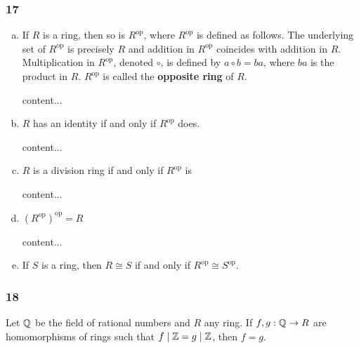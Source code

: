 \subsubsection*{17}
\begin{enumerate}[(a)]
	\item 
	\begin{graybox}
		If $R$ is a ring, then so is $R^{\text{op}}$, where $R^{\text{op}}$ is defined as follows. The underlying set of $R^{\text{op}}$ is precisely $R$ and addition in $R^{\text{op}}$ coincides with addition in $R$. Multiplication in $R^{\text{op}}$, denoted $\circ$, is defined by $a \circ b = ba$, where $ba$ is the product in $R$. $R^{\text{op}}$ is called the \textbf{opposite ring} of $R$.
	\end{graybox}
	\begin{solution}
		content...
	\end{solution}
	
	\item 
	\begin{graybox}
		$R$ has an identity if and only if $R^{\text{op}}$ does.
	\end{graybox}
	\begin{solution}
		content...
	\end{solution}
	
	\item 
	\begin{graybox}
		$R$ is a division ring if and only if $R^{\text{op}}$ is
	\end{graybox}
	\begin{solution}
		content...
	\end{solution}
	
	\item 
	\begin{graybox}
		$\left(R^{\text{op}}\right)^{\text{op}} = R$
	\end{graybox}
	\begin{solution}
		content...
	\end{solution}
	
	\item
	\begin{graybox}
		If $S$ is a ring, then $R \cong S$ if and only if $R^{\text{op}} \cong S^{\text{op}}$.
	\end{graybox}
\end{enumerate}

\subsubsection*{18}
\begin{graybox}
	Let $\mathbb{Q}$ be the field of rational numbers and $R$ any ring. If $f,g : \mathbb{Q} \to R$ are homomorphisms of rings such that $f\mid\mathbb{Z} = g\mid\mathbb{Z}$, then $f = g$.
\end{graybox}

